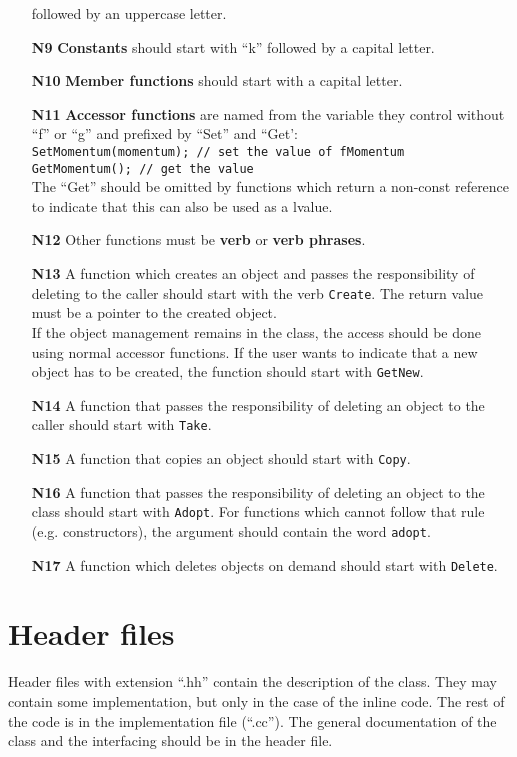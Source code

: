 \begin{itemize}
  followed by an uppercase letter.
\item[\bf N9] {\bf Constants} should start with ``k'' followed by a capital 
  letter.
\item[\bf N10] {\bf Member functions} should start with a capital letter.
\item[\bf N11] {\bf Accessor functions} are named from the variable they
  control without ``f'' or ``g'' and prefixed by ``Set'' and ``Get':\\
  {\tt SetMomentum(momentum);   // set the value of fMomentum \\
       GetMomentum();           // get the value }\\
  The ``Get'' should be omitted by functions which return a non-const
  reference to indicate that this can also be used as a lvalue.
\item[\bf N12] Other functions must be {\bf verb} or {\bf verb phrases}.
\item[\bf N13] A function which creates an object and passes the responsibility
  of deleting to the caller should start with the verb {\tt Create}. The
  return value must be a pointer to the created object.\\
  If the object management remains in the class, the access should be done
  using normal accessor functions. If the user wants to indicate that a
  new object has to be created, the function should start with {\tt GetNew}.
\item[\bf N14] A function that passes the responsibility of deleting an
  object to the caller should start with {\tt Take}.
\item[\bf N15] A function that copies an object should start with {\tt Copy}.
\item[\bf N16] A function that passes the responsibility of deleting an
  object to the class should start with {\tt Adopt}. For functions which cannot
  follow that rule (e.g. constructors), the argument should contain the
  word {\tt adopt}.
\item[\bf N17] A function which deletes objects on demand should start with
  {\tt Delete}.
\end{itemize}

\section{Header files}

Header files with extension ``.hh'' contain the description of the class.
They may contain some implementation, but only in the case of the inline
code. The rest of the code is in the implementation file (``.cc''). The
general documentation of the class and the interfacing should be in
the header file.

